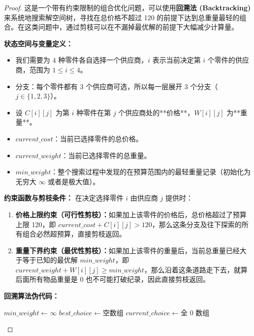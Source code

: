 \documentclass[11pt, a4paper]{article}
\begin{document}
\begin{proof}
    这是一个带有约束限制的组合优化问题，可以使用\textbf{回溯法 (Backtracking)}来系统地搜索解空间树，寻找在总价格不超过 120 的前提下达到总重量最轻的组合。在这类问题中，通过剪枝可以在不漏掉最优解的前提下大幅减少计算量。

    \textbf{状态空间与变量定义：}
    \begin{itemize}
        \item 我们需要为 $4$ 种零件各自选择一个供应商，$i$ 表示当前决定第 $i$ 个零件的供应商，范围为 $1 \le i \le 4$。
        \item 分支：每个零件都有 $3$ 个供应商可选，所以每一层展开 $3$ 个分支（$j \in \{1, 2, 3\}$）。
        \item 设 $C[i][j]$ 为第 $i$ 种零件在第 $j$ 个供应商处的**价格**，$W[i][j]$ 为**重量**。
        \item $current\_cost$：当前已选择零件的总价格。
        \item $current\_weight$：当前已选择零件的总重量。
        \item $min\_weight$：整个搜索过程中发现的在预算范围内的最轻重量记录（初始化为无穷大 $\infty$ 或者是极大值）。
    \end{itemize}

    \textbf{约束函数与剪枝条件：}
    在决定选择零件 $i$ 由供应商 $j$ 提供时：
    \begin{enumerate}
        \item \textbf{价格上限约束（可行性剪枝）：}如果加上该零件的价格后，总价格超过了预算上限 120，即 $current\_cost + C[i][j] > 120$，那么这条分支及往下探索的所有组合必然超预算，直接剪枝返回。
        \item \textbf{重量下界约束（最优性剪枝）：}如果加上该零件的重量后，当前总重量已经大于等于已知的最优解 $min\_weight$，即 $current\_weight + W[i][j] \ge min\_weight$，那么沿着这条道路走下去，就算后面所有物品重量是 0 也不可能打破纪录，因此直接剪枝返回。
    \end{enumerate}

    \textbf{回溯算法伪代码：}

    \begin{algorithm}[H]
    \caption{最小重量机器设计 - 回溯搜索}
    
    $min\_weight \gets \infty$\;
    $best\_choice \gets \text{空数组}$ 
    $current\_choice \gets \text{全 } 0 \text{ 数组}$\;
    

\end{algorithm}
\end{proof}
\end{document}
